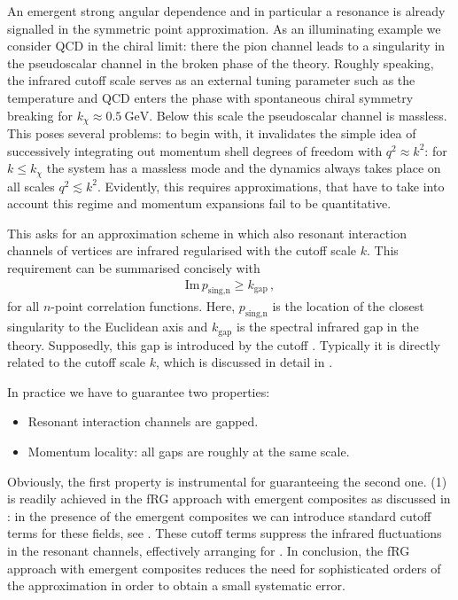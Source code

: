 \documentclass[aps,twocolumn,prd,superscriptaddress]{revtex4-2}
\begin{document}
An emergent strong angular dependence and in particular a resonance is already signalled in the symmetric point approximation. As an illuminating example we consider QCD in the chiral limit: there the pion channel leads to a singularity in the pseudoscalar channel in the broken phase of the theory. Roughly speaking, the infrared cutoff scale serves as an external tuning parameter such as the temperature and QCD enters the phase with spontaneous chiral symmetry breaking for $k_\chi \approx \qty{0.5}{\GeV}$. Below this scale the pseudoscalar channel is massless. This poses several problems: to begin with, it invalidates the simple idea of successively integrating out momentum shell degrees of freedom with $q^2\approx k^2$: for $k\leq k_\chi$ the system has a massless mode and the dynamics always takes place on all scales $q^2 \lesssim k^2$. Evidently, this requires approximations, that have to take into account this regime and momentum expansions fail to be quantitative. 

This asks for an approximation scheme in which also resonant interaction channels of vertices are infrared regularised with the cutoff scale $k$. This requirement can be summarised concisely with 
%
\begin{align} 
	\textrm{Im} \,p_\textrm{sing,n} \geq k_\textrm{gap}\,,
	\label{eq:PhysGap}
\end{align}
% 
for all $n$-point correlation functions. Here, $p_\textrm{sing,n}$ is the location of the closest singularity to the Euclidean axis and $k_\textrm{gap}$ is the spectral infrared gap in the theory. Supposedly, this gap is introduced by the cutoff . Typically it is directly related to the cutoff scale $k$, which is discussed in detail in \cite{Pawlowski:2005xe, Pawlowski:2015mlf, Ihssen:2023xlp}. 

In practice we have to guarantee two properties: 
%
\begin{itemize} 
\item[(1)] Resonant interaction channels are gapped. 
\item[(2)] Momentum locality: all gaps are roughly at the same scale.
\end{itemize} 
%
Obviously, the first property is instrumental for guaranteeing the second one. (1) is readily achieved in the fRG approach with emergent composites as discussed in : in the presence of the emergent composites we can introduce standard cutoff terms for these fields, see . These cutoff terms suppress the infrared fluctuations in the resonant channels, effectively arranging for . In conclusion, the fRG approach with emergent composites reduces the need for sophisticated orders of the approximation in order to obtain a small systematic error. 
\end{document}
